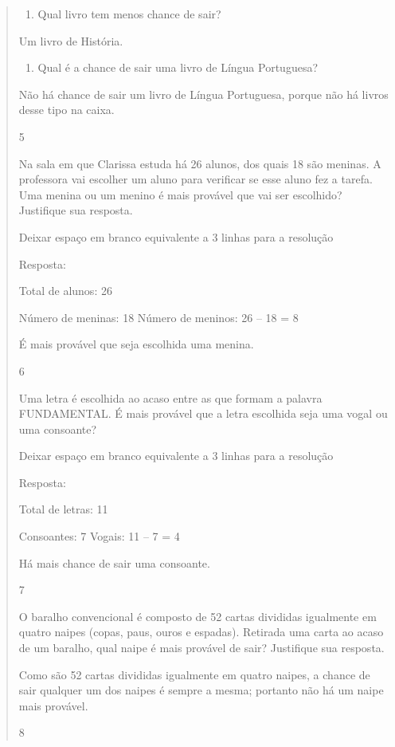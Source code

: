 \begin{mdframed}[linewidth=2pt,linecolor=salmao,roundcorner=2pt]
\begin{itemize}
{\begin{itemize}
\begin{escolha}
{\begin{quote}
{\begin{escolha}
{\begin{enumerate}
\item
  Qual livro tem menos chance de sair?
\end{enumerate}

Um livro de História.

\begin{enumerate}
\item
  Qual é a chance de sair uma livro de Língua Portuguesa?
\end{enumerate}

Não há chance de sair um livro de Língua Portuguesa, porque não há livros desse tipo na caixa.



\num{5}

Na sala em que Clarissa estuda há 26 alunos, dos quais 18 são meninas. A
professora vai escolher um aluno para verificar se esse aluno fez a tarefa.
Uma menina ou um menino é mais provável que vai ser escolhido? Justifique sua resposta.

Deixar espaço em branco equivalente a 3 linhas para a resolução

Resposta:

Total de alunos: 26

Número de meninas: 18
Número de meninos: 26 -- 18 = 8

É mais provável que seja escolhida uma menina.

\num{6}

Uma letra é escolhida ao acaso entre as que formam a palavra
FUNDAMENTAL. É mais provável que a letra escolhida seja uma vogal ou uma consoante?

Deixar espaço em branco equivalente a 3 linhas para a resolução

Resposta:

Total de letras: 11

Consoantes: 7
Vogais: 11 -- 7 = 4

Há mais chance de sair uma consoante.

\num{7}

O baralho convencional é composto de 52 cartas divididas igualmente em quatro
naipes (copas, paus, ouros e espadas). Retirada uma carta ao acaso de um baralho,
qual naipe é mais provável de sair? Justifique sua resposta.

Como são 52 cartas divididas igualmente em quatro naipes, a chance de sair qualquer um dos naipes é sempre a mesma; portanto não há um naipe mais provável.

\num{8}

}
\end{escolha}}
\end{quote}}
\end{escolha}
\end{itemize}}
\end{itemize}
\end{mdframed}
